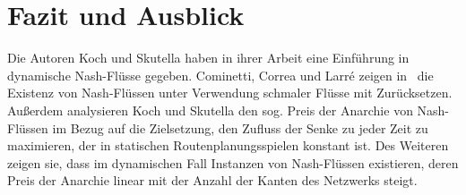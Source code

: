 \section{Fazit und Ausblick}

Die Autoren Koch und Skutella haben in ihrer Arbeit eine Einführung in dynamische Nash-Flüsse gegeben.
Cominetti, Correa und Larré zeigen in~\cite{Cominetti2015} die Existenz von Nash-Flüssen unter Verwendung schmaler Flüsse mit Zurücksetzen.
Außerdem analysieren Koch und Skutella den sog. Preis der Anarchie von Nash-Flüssen im Bezug auf die Zielsetzung, den Zufluss der Senke zu jeder Zeit zu maximieren, der in statischen Routenplanungsspielen konstant ist.
Des Weiteren zeigen sie, dass im dynamischen Fall Instanzen von Nash-Flüssen existieren, deren Preis der Anarchie linear mit der Anzahl der Kanten des Netzwerks steigt.